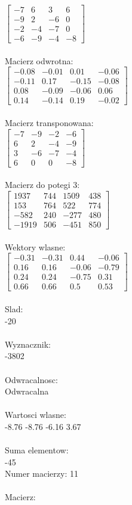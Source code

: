 \documentclass[a4paper,12pt]{article}
\begin{document}
$\begin{bmatrix} -7&6&3&6\\-9&2&-6&0\\-2&-4&-7&0\\-6&-9&-4&-8 \end{bmatrix}$
\\
\\
Macierz odwrotna:\\

$\begin{bmatrix} -0.08&-0.01&0.01&-0.06\\-0.11&0.17&-0.15&-0.08\\0.08&-0.09&-0.06&0.06\\0.14&-0.14&0.19&-0.02 \end{bmatrix}$
\\
\\
Macierz transponowana:\\

$\begin{bmatrix} -7&-9&-2&-6\\6&2&-4&-9\\3&-6&-7&-4\\6&0&0&-8 \end{bmatrix}$
\\
\\
Macierz do potegi 3:\\

$\begin{bmatrix} 1937&744&1509&438\\153&764&522&774\\-582&240&-277&480\\-1919&506&-451&850 \end{bmatrix}$
\\
\\
Wektory wlasne:\\

$\begin{bmatrix} -0.31&-0.31&0.44&-0.06\\0.16&0.16&-0.06&-0.79\\0.24&0.24&-0.75&0.31\\0.66&0.66&0.5&0.53 \end{bmatrix}$
\\
\\
Slad:\\
-20
\\
\\
Wyznacznik:\\
-3802
\\
\\
Odwracalnosc:\\
Odwracalna
\\
\\
Wartosci wlasne:\\
-8.76 -8.76 -6.16 3.67
\\
\\
Suma elementow:\\
-45
\\
\newpage
Numer macierzy:
11
\\
\\
Macierz:\\
\end{document}
